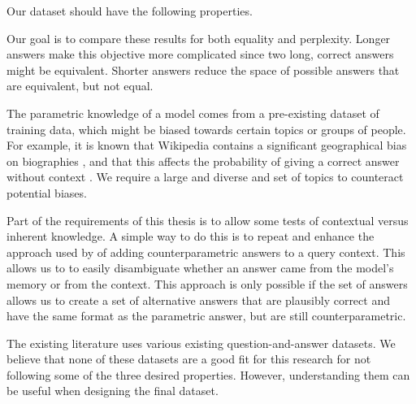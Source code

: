 Our dataset should have the following properties.
\begin{description}[style=nextline]
	\item[1. Questions should have short, unambiguous answers.]
		Our goal is to compare these results for both equality and perplexity. Longer answers make this objective more complicated since two long, correct answers might be equivalent. Shorter answers reduce the space of possible answers that are equivalent, but not equal.
	\item[2. Questions must cover a large and diverse set of topics.]
	    The parametric knowledge of a model comes from a pre-existing dataset of training data, which might be biased towards certain topics or groups of people. For example, it is known that Wikipedia contains a significant geographical bias on biographies \citep{wikipedia_geographic_bias}, and that this affects the probability of giving a correct answer without context \citep{factual_recall}.
		We require a large and diverse and set of topics to counteract potential biases.
	\item[3. Questions must allow for the creation of counterparametric answers.]
		Part of the requirements of this thesis is to allow some tests of contextual versus inherent knowledge.
	    A simple way to do this is to repeat and enhance the approach used by \citeauthor{factual_recall} of adding counterparametric answers to a query context.
		This allows us to to easily disambiguate whether an answer came from the model's memory or from the context.
	    This approach is only possible if the set of answers allows us to create a set of alternative answers that are plausibly correct and have the same format as the parametric answer, but are still counterparametric.
\end{description}

The existing literature uses various existing question-and-answer datasets.
We believe that none of these datasets are a good fit for this research for not following some of the three desired properties.
However, understanding them can be useful when designing the final dataset.

